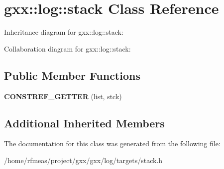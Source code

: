 \hypertarget{classgxx_1_1log_1_1stack}{}\section{gxx\+:\+:log\+:\+:stack Class Reference}
\label{classgxx_1_1log_1_1stack}


Inheritance diagram for gxx\+:\+:log\+:\+:stack\+:


Collaboration diagram for gxx\+:\+:log\+:\+:stack\+:
\subsection*{Public Member Functions}
\begin{DoxyCompactItemize}
\item 
{\bfseries C\+O\+N\+S\+T\+R\+E\+F\+\_\+\+G\+E\+T\+T\+ER} (list, stck)\hypertarget{classgxx_1_1log_1_1stack_a7995e5389618a3c8e6d603bcf74c3c71}{}\label{classgxx_1_1log_1_1stack_a7995e5389618a3c8e6d603bcf74c3c71}

\end{DoxyCompactItemize}
\subsection*{Additional Inherited Members}


The documentation for this class was generated from the following file\+:\begin{DoxyCompactItemize}
\item 
/home/rfmeas/project/gxx/gxx/log/targets/stack.\+h\end{DoxyCompactItemize}
